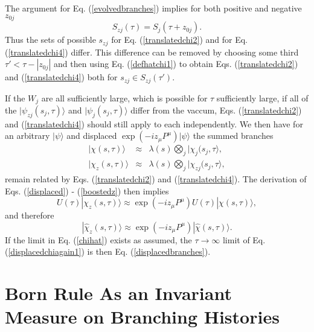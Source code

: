 \documentclass[12pt,amsmath,amssymb,onecolumn]{revtex4-2}
\begin{document}
The argument for Eq. (\ref{evolvedbranches})
implies for both positive and negative $z_{0j}$
\begin{equation}
  \label{translatedbraches}
  S_{zj}( \tau) = S_j( \tau + z_{0j}).
\end{equation}
Thus the sets of possible $s_{zj}$ for Eq. (\ref{translatedchi2}) and
for Eq. (\ref{translatedchi4}) differ. This difference can be
removed by choosing some third $\tau' < \tau - |z_{0j}|$ and then
using Eq. (\ref{defhatchi1}) to obtain Eqs. (\ref{translatedchi2}) and (\ref{translatedchi4})
both for $s_{zj} \in S_{zj}( \tau')$.


If the $W_j$ are all sufficiently large, which is possible for $\tau$ sufficiently large,
if all of the $|\psi_{zj}( s_j, \tau) \rangle $ and $|\psi_j( s_j, \tau) \rangle $ differ from
the vaccum, 
Eqs. (\ref{translatedchi2}) and (\ref{translatedchi4}) should still apply to each
independently.  We then have for an arbitrary $|\psi \rangle $ and  displaced
$\exp( -i  z_\mu P^\mu ) |\psi \rangle $ the summed branches
\begin{subequations}
  \begin{eqnarray}
    \label{chiprod}
    |\chi( s, \tau) \rangle  & \approx & \lambda( s) \bigotimes_j |\chi_j( s_j, \tau \rangle , \\
    \label{chiprodz}
    |\chi_z( s, \tau) \rangle  & \approx & \lambda( s) \bigotimes_j |\chi_{zj}( s_j, \tau \rangle ,
  \end{eqnarray}
\end{subequations}
remain related by Eqs. (\ref{translatedchi2}) and (\ref{translatedchi4}).
The derivation of Eqs. (\ref{displaced}) - (\ref{boostedz}) then implies
\begin{equation}
  \label{displacedchiagain}
  U( \tau) |\chi_z( s, \tau) \rangle  \approx \exp( -iz_\mu P^\mu) U( \tau) |\chi( s, \tau) \rangle ,
\end{equation}
and therefore 
\begin{equation}
  \label{displacedchiagain1}
  |\hat{\chi}_z( s, \tau) \rangle  \approx \exp( -iz_\mu P^\mu) |\hat{\chi}( s, \tau) \rangle .
\end{equation}
If the limit in Eq. (\ref{chihat}) exists as assumed, 
the $\tau \rightarrow \infty$ limit of Eq. (\ref{displacedchiagain1}) is then
Eq. (\ref{displacedbranches}).


\section{\label{sec:bornrule} Born Rule As an Invariant Measure on Branching Histories}
\end{document}
